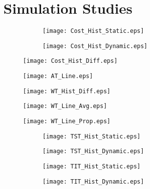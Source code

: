 \chapter{Simulation Studies}

\begin{figure}[htb]
	\centering
	\begin{subfigure}[t]{0.45\textwidth}
		\centering
		\texttt{[image: Cost\_Hist\_Static.eps]}
	\end{subfigure}
	\begin{subfigure}[t]{0.45\textwidth}
		\centering
		\texttt{[image: Cost\_Hist\_Dynamic.eps]}
	\end{subfigure}
	\caption{}
\end{figure}

\begin{figure}[htb]
	\centering
	\texttt{[image: Cost\_Hist\_Diff.eps]}
	\caption{}
\end{figure}

\begin{figure}[htb]
	\centering
	\texttt{[image: AT\_Line.eps]}
	\caption{}
\end{figure}

\begin{figure}[htb]
	\centering
	\texttt{[image: WT\_Hist\_Diff.eps]}
	\caption{}
\end{figure}

\begin{figure}[htb]
	\centering
	\texttt{[image: WT\_Line\_Avg.eps]}
	\caption{}
\end{figure}

\begin{figure}[htb]
	\centering
	\texttt{[image: WT\_Line\_Prop.eps]}
	\caption{}
\end{figure}

\begin{figure}[htb]
	\centering
	\begin{subfigure}[t]{0.45\textwidth}
		\centering
		\texttt{[image: TST\_Hist\_Static.eps]}
	\end{subfigure}
	\begin{subfigure}[t]{0.45\textwidth}
		\centering
		\texttt{[image: TST\_Hist\_Dynamic.eps]}
	\end{subfigure}
	\caption{}
\end{figure}

\begin{figure}[htb]
	\centering
	\begin{subfigure}[t]{0.45\textwidth}
		\centering
		\texttt{[image: TIT\_Hist\_Static.eps]}
	\end{subfigure}
	\begin{subfigure}[t]{0.45\textwidth}
		\centering
		\texttt{[image: TIT\_Hist\_Dynamic.eps]}
	\end{subfigure}
	\caption{}
\end{figure}